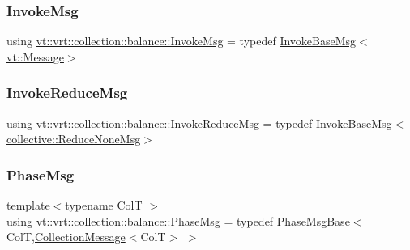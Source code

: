 \mbox{\label{namespacevt_1_1vrt_1_1collection_1_1balance_a20d9331394b59e8a64e4616d22fa4f18}} 
\subsubsection{\texorpdfstring{Invoke\+Msg}{InvokeMsg}}
{\footnotesize\ttfamily using \hyperlink{namespacevt_1_1vrt_1_1collection_1_1balance_a20d9331394b59e8a64e4616d22fa4f18}{vt\+::vrt\+::collection\+::balance\+::\+Invoke\+Msg} = typedef \hyperlink{structvt_1_1vrt_1_1collection_1_1balance_1_1_invoke_base_msg}{Invoke\+Base\+Msg}$<$\hyperlink{namespacevt_a3a3ddfef40b4c90915fa43cdd5f129ea}{vt\+::\+Message}$>$}

\mbox{\label{namespacevt_1_1vrt_1_1collection_1_1balance_ace206d13ca2e76a7622176bb08e1e3e0}} 
\subsubsection{\texorpdfstring{Invoke\+Reduce\+Msg}{InvokeReduceMsg}}
{\footnotesize\ttfamily using \hyperlink{namespacevt_1_1vrt_1_1collection_1_1balance_ace206d13ca2e76a7622176bb08e1e3e0}{vt\+::vrt\+::collection\+::balance\+::\+Invoke\+Reduce\+Msg} = typedef \hyperlink{structvt_1_1vrt_1_1collection_1_1balance_1_1_invoke_base_msg}{Invoke\+Base\+Msg}$<$\hyperlink{namespacevt_1_1collective_aa439a90f05078f2bcf918641c951946f}{collective\+::\+Reduce\+None\+Msg}$>$}

\mbox{\label{namespacevt_1_1vrt_1_1collection_1_1balance_a7120dc064f6e8c4157a5f4c81b825393}} 
\subsubsection{\texorpdfstring{Phase\+Msg}{PhaseMsg}}
{\footnotesize\ttfamily template$<$typename ColT $>$ \\
using \hyperlink{namespacevt_1_1vrt_1_1collection_1_1balance_a7120dc064f6e8c4157a5f4c81b825393}{vt\+::vrt\+::collection\+::balance\+::\+Phase\+Msg} = typedef \hyperlink{structvt_1_1vrt_1_1collection_1_1balance_1_1_phase_msg_base}{Phase\+Msg\+Base}$<$ColT,\hyperlink{structvt_1_1vrt_1_1collection_1_1_collection_message}{Collection\+Message}$<$ColT$>$ $>$}

